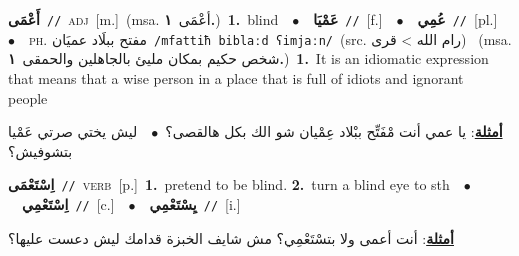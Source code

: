 \documentclass[10pt,a4paper,twoside]{article} %
\begin{document}
\begin{multicols}{2}
{\setlength\topsep{0pt}\textbf{\foreignlanguage{arabic}{أَعْمَى}}\ {\color{gray}\texttt{//}\color{black}}\ \textsc{adj}\ [m.]\ \color{gray}(msa. \foreignlanguage{arabic}{أعْمَى}~\foreignlanguage{arabic}{\textbf{١.}})\color{black}\ \textbf{1.}~blind\ \ $\bullet$\ \ \setlength\topsep{0pt}\textbf{\foreignlanguage{arabic}{عَمْيَا}}\ {\color{gray}\texttt{//}\color{black}}\ [f.]\ \ $\bullet$\ \ \setlength\topsep{0pt}\textbf{\foreignlanguage{arabic}{عُمِي}}\ {\color{gray}\texttt{//}\color{black}}\ [pl.]\ \ $\bullet$\ \ \textsc{ph.} \color{gray} \foreignlanguage{arabic}{مفتح ببلَاد عميَان}\color{black}\ {\color{gray}\texttt{/{\sffamily mfattiħ biblaːd ʕimjaːn}/}\color{black}}\ \color{gray}(src. \foreignlanguage{arabic}{رام الله > قرى})\color{black}\ \color{gray} (msa. \foreignlanguage{arabic}{شخص حكيم بمكان مليئ بالجاهلين والحمقى}~\foreignlanguage{arabic}{\textbf{١.}})\color{black}\ \textbf{1.}~It is an idiomatic expression that means that a wise person in a place that is full of idiots and ignorant people\  \begin{flushright}\color{gray}\foreignlanguage{arabic}{\textbf{\underline{\foreignlanguage{arabic}{أمثلة}}}: يا عمي أنت مْفَتِّح ببْلاد عِمْيان شو الك بكل هالقصى؟\ $\bullet$\ \  ليش يختي صرتي عَمْيا بتشوفيش؟}\end{flushright}\color{black}} \vspace{2mm}

{\setlength\topsep{0pt}\textbf{\foreignlanguage{arabic}{اِسْتَعْمَى}}\ {\color{gray}\texttt{//}\color{black}}\ \textsc{verb}\ [p.]\ \textbf{1.}~pretend to be blind.  \textbf{2.}~turn a blind eye to sth\ \ $\bullet$\ \ \setlength\topsep{0pt}\textbf{\foreignlanguage{arabic}{اِسْتَعْمِي}}\ {\color{gray}\texttt{//}\color{black}}\ [c.]\ \ $\bullet$\ \ \setlength\topsep{0pt}\textbf{\foreignlanguage{arabic}{يِسْتَعْمِي}}\ {\color{gray}\texttt{//}\color{black}}\ [i.]\  \begin{flushright}\color{gray}\foreignlanguage{arabic}{\textbf{\underline{\foreignlanguage{arabic}{أمثلة}}}: أنت أعمى ولا بتسْتَعْمِي؟ مش شايف الخبزة قدامك ليش دعست عليها؟}\end{flushright}\color{black}} \vspace{2mm}


\end{multicols}
\end{document}
